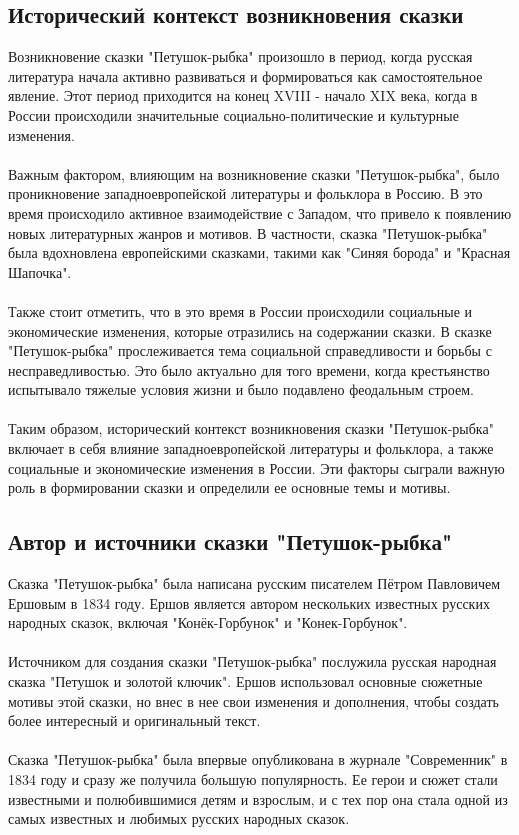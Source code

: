 \documentclass{article}
\begin{document}
\subsection{Исторический контекст возникновения сказки}
Возникновение сказки "{}{}Петушок-рыбка"{}{} произошло в период, когда русская литература начала активно развиваться и формироваться как самостоятельное явление. Этот период приходится на конец XVIII - начало XIX века, когда в России происходили значительные социально-политические и культурные изменения.\\
~\\
Важным фактором, влияющим на возникновение сказки "{}{}Петушок-рыбка"{}{}, было проникновение западноевропейской литературы и фольклора в Россию. В это время происходило активное взаимодействие с Западом, что привело к появлению новых литературных жанров и мотивов. В частности, сказка "{}{}Петушок-рыбка"{}{} была вдохновлена европейскими сказками, такими как "{}{}Синяя борода"{}{} и "{}{}Красная Шапочка"{}{}.\\
~\\
Также стоит отметить, что в это время в России происходили социальные и экономические изменения, которые отразились на содержании сказки. В сказке "{}{}Петушок-рыбка"{}{} прослеживается тема социальной справедливости и борьбы с несправедливостью. Это было актуально для того времени, когда крестьянство испытывало тяжелые условия жизни и было подавлено феодальным строем.\\
~\\
Таким образом, исторический контекст возникновения сказки "{}{}Петушок-рыбка"{}{} включает в себя влияние западноевропейской литературы и фольклора, а также социальные и экономические изменения в России. Эти факторы сыграли важную роль в формировании сказки и определили ее основные темы и мотивы.
\subsection{Автор и источники сказки "{}{}Петушок-рыбка"{}{}}
Сказка "{}{}Петушок-рыбка"{}{} была написана русским писателем Пётром Павловичем Ершовым в 1834 году. Ершов является автором нескольких известных русских народных сказок, включая "{}{}Конёк-Горбунок"{}{} и "{}{}Конек-Горбунок"{}{}.\\
~\\
Источником для создания сказки "{}{}Петушок-рыбка"{}{} послужила русская народная сказка "{}{}Петушок и золотой ключик"{}{}. Ершов использовал основные сюжетные мотивы этой сказки, но внес в нее свои изменения и дополнения, чтобы создать более интересный и оригинальный текст.\\
~\\
Сказка "{}{}Петушок-рыбка"{}{} была впервые опубликована в журнале "{}{}Современник"{}{} в 1834 году и сразу же получила большую популярность. Ее герои и сюжет стали известными и полюбившимися детям и взрослым, и с тех пор она стала одной из самых известных и любимых русских народных сказок.\\
~\\
\end{document}
